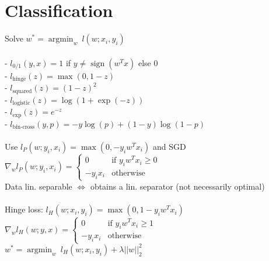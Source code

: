 \section*{Classification}
Solve $w^* = \operatorname{argmin}_w ~ l(w;x_i,y_i)$\\
\\
{- $l_{0/1} \left(y,x\right) = 1$  if $y \neq \operatorname{sign}\left(w^Tx\right)$ else 0}\\
- $l_{\text{hinge}}(z) = \max\left(0,1-z\right) $ \\
- $l_{\text{squared}}(z) = (1-z)^2$\hfill\\
- $l_{\text{logistic}}(z) = \log\left(1+\exp(-z)\right)$ \\
- $l_{\text{exp}}(z) = e^{-z}$ \\
- $l_{\text{bin-cross}}(y,p) = - y\log(p) + (1-y)\log(1-p)$\\
\\
Use $l_P (w;y_i,x_i) = \operatorname{max}(0, -y_i w^T x_i)$ and SGD\\
$\nabla_w l_P(w;y_i,x_i) = 
\begin{cases}
    0 &\text{if } y_i w^T x_i \geq 0\\
    -y_i x_i &\text{otherwise}
\end{cases}$ \\
Data lin. separable $\Leftrightarrow$ obtains a lin. separator (not necessarily optimal)\\
\\
Hinge loss: $l_H(w;x_i,y_i) = \operatorname{max}(0,1-y_i w^T x_i)$ \\
$\nabla_w l_H(w;y,x) = 
\begin{cases}
    0 &\text{if } y_i w^T x_i \geq 1\\
    -y_i x_i &\text{otherwise}
\end{cases}$\\
$w^* = {\operatorname{argmin}}_w ~ l_H(w;x_i,y_i) + \lambda||w||_2^2$
